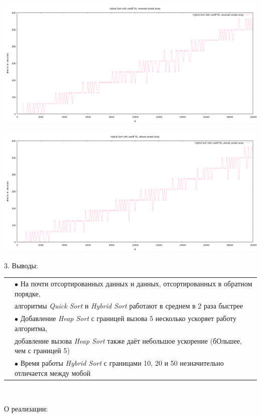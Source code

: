 \documentclass[11pt,a4paper]{article}
\begin{document}
\hspace*{-2cm} \includegraphics[scale=0.5]{hybrid_sort_50_reversed_arr.PNG}

\hspace*{-2cm} \includegraphics[scale=0.5]{hybrid_sort_50_almost_sorted_arr.PNG}


3. Выводы:

\begin{tabular}{rl}
    & $\bullet$ На почти отсортированных данных и
    данных, отсортированных в обратном порядке, \\
    &алгоритмы \textit{Quick Sort} и \textit{Hybrid Sort} 
    работают в среднем в 2 раза быстрее \\
    & $\bullet$ Добавление \textit{Heap Sort} с границей 
    вызова 5 несколько ускоряет работу алгоритма, \\
    & добавление вызова \textit{Heap Sort} также даёт 
    небольшое ускорение (бОльшее, чем с границей 5)\\
    & $\bullet$ Время работы \textit{Hybrid Sort} с границами
    10, 20 и 50 незначительно отличается между мобой \\
\end{tabular}
\\

\pagebreak

О реализации:
\end{document}
